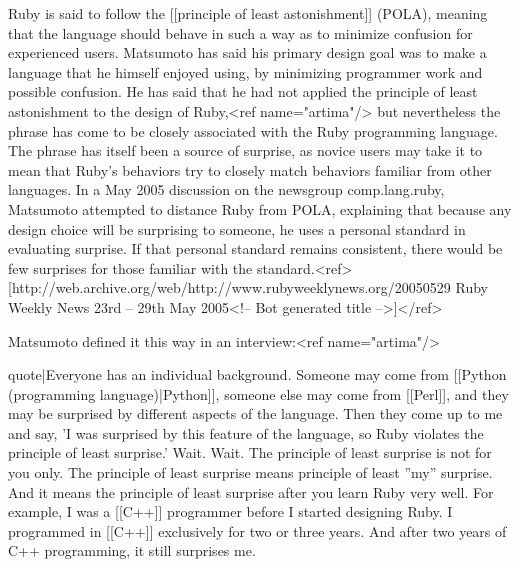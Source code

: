 Ruby is said to follow the [[principle of least astonishment]] (POLA), meaning that the language should behave in such a way as to minimize confusion for experienced users. Matsumoto has said his primary design goal was to make a language that he himself enjoyed using, by minimizing programmer work and possible confusion. He has said that he had not applied the principle of least astonishment to the design of Ruby,<ref name="artima"/> but nevertheless the phrase has come to be closely associated with the Ruby programming language. The phrase has itself been a source of surprise, as novice users may take it to mean that Ruby's behaviors try to closely match behaviors familiar from other languages. In a May 2005 discussion on the newsgroup comp.lang.ruby, Matsumoto attempted to distance Ruby from POLA, explaining that because any design choice will be surprising to someone, he uses a personal standard in evaluating surprise. If that personal standard remains consistent, there would be few surprises for those familiar with the standard.<ref>[http://web.archive.org/web/http://www.rubyweeklynews.org/20050529 Ruby Weekly News 23rd – 29th May 2005<!-- Bot generated title -->]</ref>

Matsumoto defined it this way in an interview:<ref name="artima"/>

{{quote|Everyone has an individual background. Someone may come from [[Python (programming language)|Python]], someone else may come from [[Perl]], and they may be surprised by different aspects of the language. Then they come up to me and say, 'I was surprised by this feature of the language, so Ruby violates the principle of least surprise.' Wait. Wait. The principle of least surprise is not for you only. The principle of least surprise means principle of least ''my'' surprise. And it means the principle of least surprise after you learn Ruby very well. For example, I was a [[C++]] programmer before I started designing Ruby. I programmed in [[C++]] exclusively for two or three years. And after two years of C++ programming, it still surprises me.}}

